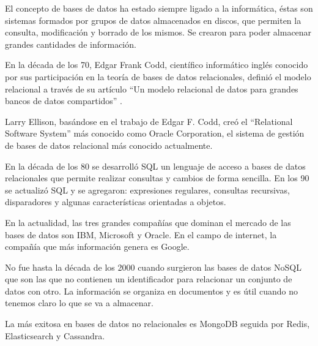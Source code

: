 \documentclass[12pt]{report} %
\begin{document}
	El concepto de bases de datos ha estado siempre ligado a la informática, éstas son sistemas formados por grupos de datos almacenados en discos, que permiten la consulta, modificación y borrado de los mismos. Se crearon para poder almacenar grandes cantidades de información. 
	
	En la década de los 70, Edgar Frank Codd, científico informático inglés conocido por sus participación en la teoría de bases de datos relacionales, definió el modelo relacional  a través de su artículo “Un modelo relacional de datos para grandes bancos de datos compartidos” \cite{RelationalModel}.
	
	Larry Ellison, basándose en el trabajo de Edgar F. Codd, creó el “Relational Software System” más conocido como Oracle Corporation, el sistema de gestión de bases de datos relacional más conocido actualmente.
	
	En la década de los 80 se desarrolló SQL un lenguaje de acceso a bases de datos relacionales que permite realizar consultas y cambios de forma sencilla. En los 90 se actualizó SQL y se agregaron: expresiones regulares, consultas recursivas, disparadores y algunas características orientadas a objetos.
	
	En la actualidad, las tres grandes compañías que dominan el mercado de las bases de datos son IBM, Microsoft y Oracle. En el campo de internet, la compañía que más información genera es Google.
	
	No fue hasta la década de los 2000 cuando surgieron las bases de datos NoSQL que son las que no contienen un identificador para relacionar un conjunto de datos con otro. La información se organiza en documentos y es útil cuando no tenemos claro lo que se va a almacenar.
	
	La más exitosa en bases de datos no relacionales es MongoDB seguida por Redis, Elasticsearch y Cassandra.
	
\end{document}
